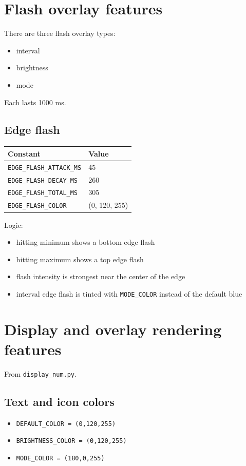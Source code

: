 \documentclass[11pt]{article}
\begin{document}
\section{Flash overlay features}
There are three flash overlay types:
\begin{itemize}
  \item interval
  \item brightness
  \item mode
\end{itemize}
Each lasts 1000 ms.

\subsection{Edge flash}
\begin{center}
\begin{tabular}{ll}
\toprule
Constant & Value \\
\midrule
\texttt{EDGE\_FLASH\_ATTACK\_MS} & 45 \\
\texttt{EDGE\_FLASH\_DECAY\_MS} & 260 \\
\texttt{EDGE\_FLASH\_TOTAL\_MS} & 305 \\
\texttt{EDGE\_FLASH\_COLOR} & (0, 120, 255) \\
\bottomrule
\end{tabular}
\end{center}

Logic:
\begin{itemize}
  \item hitting minimum shows a bottom edge flash
  \item hitting maximum shows a top edge flash
  \item flash intensity is strongest near the center of the edge
  \item interval edge flash is tinted with \texttt{MODE\_COLOR} instead of the default blue
\end{itemize}

\section{Display and overlay rendering features}
From \texttt{display\_num.py}.

\subsection{Text and icon colors}
\begin{itemize}
  \item \texttt{DEFAULT\_COLOR = (0,120,255)}
  \item \texttt{BRIGHTNESS\_COLOR = (0,120,255)}
  \item \texttt{MODE\_COLOR = (180,0,255)}
\end{itemize}
\end{document}
